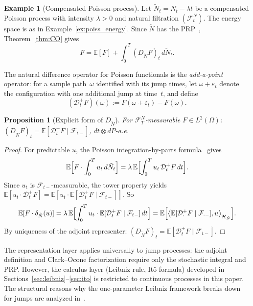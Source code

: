\documentclass[11pt,a4paper]{article}
\theoremstyle{plain}
\newtheorem{proposition}[theorem]{Proposition}
\theoremstyle{definition}
\newtheorem{example}[theorem]{Example}
\theoremstyle{remark}
\newcommand{\E}{\mathbb{E}}
\begin{document}
\begin{example}[Compensated Poisson process]\label{ex:poisson}
Let $\tilde{N}_t = N_t - \lambda t$ be a compensated Poisson process with intensity $\lambda > 0$ and natural filtration $(\mathcal{F}_t^N)$. The energy space is as in Example~\ref{ex:poiss_energy}. Since $\tilde{N}$ has the PRP~\cite[Chapter 12]{DiNunno2009}, Theorem~\ref{thm:CO} gives
\begin{equation}\label{eq:poisson_CO}
F = \E[F] + \int_0^T (D_{\tilde{N}} F)_t\,d\tilde{N}_t.
\end{equation}

The natural difference operator for Poisson functionals is the \emph{add-a-point} operator: for a sample path~$\omega$ identified with its jump times, let $\omega + \varepsilon_t$ denote the configuration with one additional jump at time~$t$, and define
\begin{equation}\label{eq:add_a_point}
(\mathcal{D}_t^+ F)(\omega) := F(\omega + \varepsilon_t) - F(\omega).
\end{equation}

\begin{proposition}[Explicit form of $D_{\tilde{N}}$]\label{prop:poisson_explicit}
For $\mathcal{F}_T^N$-measurable $F \in L^2(\Omega)$:
$(D_{\tilde{N}} F)_t = \E[\mathcal{D}_t^+ F \mid \mathcal{F}_{t-}]$, $dt \otimes dP$-a.e.
\end{proposition}

\begin{proof}
For predictable $u$, the Poisson integration-by-parts formula~\cite[Proposition 1.9]{Privault2009} gives
\[
\E\Bigl[F \cdot \int_0^T u_t\,d\tilde{N}_t\Bigr] = \lambda\,\E\Bigl[\int_0^T u_t\,\mathcal{D}_t^+ F\,dt\Bigr].
\]
Since $u_t$ is $\mathcal{F}_{t-}$-measurable, the tower property yields
$\E[u_t \cdot \mathcal{D}_t^+ F] = \E[u_t \cdot \E[\mathcal{D}_t^+ F \mid \mathcal{F}_{t-}]]$.
So
\[
\E[F \cdot \delta_{\tilde{N}}(u)] = \lambda\,\E\Bigl[\int_0^T u_t \cdot \E[\mathcal{D}_t^+ F \mid \mathcal{F}_{t-}]\,dt\Bigr] = \E\Bigl[\bigl\langle \E[\mathcal{D}_\cdot^+ F \mid \mathcal{F}_{\cdot-}], u \bigr\rangle_{\mathcal{H}_{\tilde{N}}}\Bigr].
\]
By uniqueness of the adjoint representer: $(D_{\tilde{N}} F)_t = \E[\mathcal{D}_t^+ F \mid \mathcal{F}_{t-}]$.
\end{proof}

The representation layer applies universally to jump processes: the adjoint definition and Clark--Ocone factorization require only the stochastic integral and PRP. However, the calculus layer (Leibniz rule, It\^o formula) developed in Sections~\ref{sec:leibniz}--\ref{sec:ito} is restricted to continuous processes in this paper. The structural reasons why the one-parameter Leibniz framework breaks down for jumps are analyzed in~\cite{Fontes2026Banach}.
\end{example}
\end{document}
